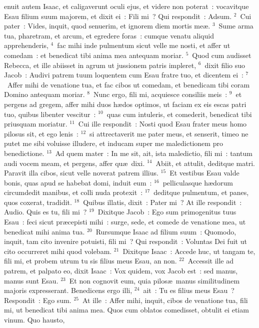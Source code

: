 \bchapter
{}enuit autem Isaac, et caligaverunt oculi ejus, et videre non poterat~: vocavitque Esau filium suum majorem, et dixit ei~: Fili mi~? Qui respondit~: Adsum.
${}^{2}$~Cui pater~: Vides, inquit, quod senuerim, et ignorem diem mortis me\ae .
${}^{3}$~Sume arma tua, pharetram, et arcum, et egredere foras~: cumque venatu aliquid apprehenderis,
${}^{4}$~fac mihi inde pulmentum sicut velle me nosti, et affer ut comedam~: et benedicat tibi anima mea antequam moriar.
${}^{5}$~Quod cum audisset Rebecca, et ille abiisset in agrum ut jussionem patris impleret,
${}^{6}$~dixit filio suo Jacob~: Audivi patrem tuum loquentem cum Esau fratre tuo, et dicentem ei~:
${}^{7}$~Affer mihi de venatione tua, et fac cibos ut comedam, et benedicam tibi coram Domino antequam moriar.
${}^{8}$~Nunc ergo, fili mi, acquiesce consiliis meis~:
${}^{9}$~et pergens ad gregem, affer mihi duos h\ae dos optimos, ut faciam ex eis escas patri tuo, quibus libenter vescitur~:
${}^{10}$~quas cum intuleris, et comederit, benedicat tibi priusquam moriatur.
${}^{11}$~Cui ille respondit~: Nosti quod Esau frater meus homo pilosus sit, et ego lenis~:
${}^{12}$~si attrectaverit me pater meus, et senserit, timeo ne putet me sibi voluisse illudere, et inducam super me maledictionem pro benedictione.
${}^{13}$~Ad quem mater~: In me sit, ait, ista maledictio, fili mi~: tantum audi vocem meam, et pergens, affer qu\ae\ dixi.
${}^{14}$~Abiit, et attulit, deditque matri. Paravit illa cibos, sicut velle noverat patrem illius.
${}^{15}$~Et vestibus Esau valde bonis, quas apud se habebat domi, induit eum~:
${}^{16}$~pelliculasque h\ae dorum circumdedit manibus, et colli nuda protexit~:
${}^{17}$~deditque pulmentum, et panes, quos coxerat, tradidit.
${}^{18}$~Quibus illatis, dixit~: Pater mi~? At ille respondit~: Audio. Quis es tu, fili mi~?
${}^{19}$~Dixitque Jacob~: Ego sum primogenitus tuus Esau~: feci sicut pr\ae cepisti mihi~: surge, sede, et comede de venatione mea, ut benedicat mihi anima tua.
${}^{20}$~Rursumque Isaac ad filium suum~: Quomodo, inquit, tam cito invenire potuisti, fili mi~? Qui respondit~: Voluntas Dei fuit ut cito occurreret mihi quod volebam.
${}^{21}$~Dixitque Isaac~: Accede huc, ut tangam te, fili mi, et probem utrum tu sis filius meus Esau, an non.
${}^{22}$~Accessit ille ad patrem, et palpato eo, dixit Isaac~: Vox quidem, vox Jacob est~: sed manus, manus sunt Esau.
${}^{23}$~Et non cognovit eum, quia pilos\ae\ manus similitudinem majoris expresserant. Benedicens ergo illi,
${}^{24}$~ait~: Tu es filius meus Esau~? Respondit~: Ego sum.
${}^{25}$~At ille~: Affer mihi, inquit, cibos de venatione tua, fili mi, ut benedicat tibi anima mea. Quos cum oblatos comedisset, obtulit ei etiam vinum. Quo hausto,
